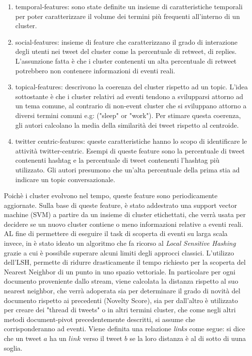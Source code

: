 \begin{enumerate}
\item temporal-features: sono state definite un insieme di caratteristiche temporali per poter caratterizzare il volume dei termini più frequenti all'interno di un cluster.
\item social-features: insieme di feature che caratterizzano il grado di interazione degli utenti nei tweet del cluster come la percentuale di retweet, di replies. L'assunzione fatta è che i cluster contenenti un alta percentuale di retweet potrebbero non contenere informazioni di eventi reali.
\item topical-features: descrivono la coerenza del cluster rispetto ad un topic. L'idea sottostante è che i cluster relativi ad eventi tendono a svilupparsi attorno ad un tema comune, al contrario di non-event cluster che si sviluppano attorno a diversi termini comuni e.g: ("sleep" or "work"). Per stimare questa coerenza, gli autori calcolano la media della similarità dei tweet rispetto al centroide.
\item twitter centric-features: queste caratteristiche hanno lo scopo di identificare le attività twitter-centric. Esempi di queste feature sono la percentuale di tweet contenenti hashtag e la percentuale di tweet contenenti l'hashtag più utilizzato. Gli autori presumono che un'alta percentuale della prima stia ad indicare un topic conversazionale.
\end{enumerate}
Poichè i cluster evolvono nel tempo, queste feature sono periodicamente aggiornate.
Sulla base di queste feature, è stato addestrato una support vector machine (SVM) a partire da un insieme di cluster etichettati, che verrà usata per decidere se un nuovo cluster contiene o meno informazioni relative a eventi reali. AL fine di permettere di eseguire il task di scoperta di eventi su larga scala invece, in \cite{Petrovic:2010:SFS:1857999.1858020} è stato ideato un algoritmo che fa ricorso al \emph{Local Sensitive Hashing}\cite{Lsh}  grazie a cui è possibile superare alcuni limiti degli approcci classici.
L'utilizzo dell'LSH, permette di ridurre drasticamente il tempo richiesto per la scoperta del Nearest Neighbor di un punto in uno spazio vettoriale.
In particolare per ogni documento proveniente dallo stream, viene calcolata la distanza rispetto al suo nearest neighbor, che verrà adoperata sia per determinare il grado di novità del documento rispetto ai precedenti (Novelty Score), sia per dall'altro è utilizzato per creare dei "thread di tweets" o in altri termini cluster, che come negli altri metodi document-pivot precedentemente descritti, si assume che  corrisponderanno ad eventi. Viene definita una relazione \emph{links} come segue: si dice che un tweet   $a$ ha un $link$ verso il tweet $b$  se la loro distanza è al di sotto di uuna soglia.  
